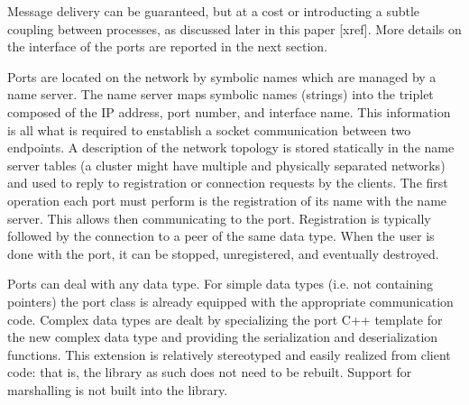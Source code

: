 
Message delivery can be guaranteed, but at a cost or introducting a subtle coupling
between processes, as discussed later in this paper [xref]. More details on the interface
of the ports are reported in the next section.


Ports are located on the network by symbolic names which are managed by a name server.
%
%
The name server maps symbolic names (strings) into the triplet 
composed of the IP address, port number, and interface name. This information is all 
what is required to enstablish a socket communication between two endpoints. 
A description of the network topology is stored statically in the name server tables (a
cluster might have multiple and physically separated networks) and used to reply to
registration or connection requests by the clients. The first operation each port must
perform is the registration of its name with the name server. This allows then
communicating to the port. Registration is typically followed by the connection to a peer
of the same data type. When the user is done with the port, it can be stopped,
unregistered, and eventually destroyed.

Ports can deal with any data type. For simple data types (i.e. not containing pointers) 
the port class is already equipped with the appropriate communication code. Complex data
types are dealt by specializing the port C++ template for the 
new complex data type and providing the serialization and deserialization functions. 
This extension is relatively stereotyped and easily realized from client code: that is, 
the library as such does not need to be rebuilt.
Support for marshalling is not built into the library.

